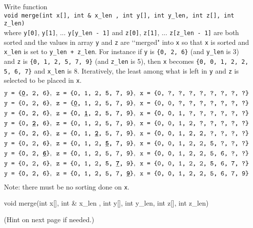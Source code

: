 

\nextq
Write function \\
\verb!void merge(int x[], int & x_len , int y[], int y_len, int z[], int z_len)!
\\
where
\verb!y[0]!,
\verb!y[1]!, ...
\verb!y[y_len - 1]!
and
\verb!z[0]!,
\verb!z[1]!, ...
\verb!z[z_len - 1]!
are both sorted
and
the values in array \verb!y! and \verb!z! are
\lq\lq merged" into \verb!x! so that
\verb!x! is sorted and \verb!x_len! is
set to \verb!y_len + z_len!.
For instance if \verb!y! is \verb!{0, 2, 6}!
(and \verb!y_len! is 3)
and \verb!z! is \verb!{0, 1, 2, 5, 7, 9}! (and \verb!z_len! is 5),
then \verb!x!
becomes \verb!{0, 0, 1, 2, 2, 5, 6, 7}!
and \verb!x_len! is 8.
Iteratively, the least among what is left in \verb!y! and \verb!z! is
selected to be placed in \verb!x!.
{\small
\begin{align*}
&\texttt{y = \{\textbf{\underline{0}}, 2, 6\}}, \,\,\,
  \texttt{z = \{0, 1, 2, 5, 7, 9\}}, \,\,\,
  \texttt{x = \{0, ?, ?, ?, ?, ?, ?, ?, ?\}}
\\
&\texttt{y = \{0, 2, 6\}}, \,\,\,
  \texttt{z = \{\textbf{\underline{0}}, 1, 2, 5, 7, 9\}}, \,\,\,
  \texttt{x = \{0, 0, ?, ?, ?, ?, ?, ?, ?\}}
\\
&\texttt{y = \{0, 2, 6\}}, \,\,\,
  \texttt{z = \{0, \textbf{\underline{1}}, 2, 5, 7, 9\}}, \,\,\,
  \texttt{x = \{0, 0, 1, ?, ?, ?, ?, ?, ?\}}
\\
&\texttt{y = \{0, \textbf{\underline{2}}, 6\}}, \,\,\,
  \texttt{z = \{0, 1, 2, 5, 7, 9\}}, \,\,\,
  \texttt{x = \{0, 0, 1, 2, ?, ?, ?, ?, ?\}}
\\
&\texttt{y = \{0, 2, 6\}}, \,\,\,
  \texttt{z = \{0, 1, \textbf{\underline{2}}, 5, 7, 9\}}, \,\,\,
  \texttt{x = \{0, 0, 1, 2, 2, ?, ?, ?, ?\}}
  \\
&\texttt{y = \{0, 2, 6\}}, \,\,\,
  \texttt{z = \{0, 1, 2, \textbf{\underline{5}}, 7, 9\}}, \,\,\,
  \texttt{x = \{0, 0, 1, 2, 2, 5, ?, ?, ?\}}
  \\
&\texttt{y = \{0, 2, \textbf{\underline{6}}\}}, \,\,\,
  \texttt{z = \{0, 1, 2, 5, 7, 9\}}, \,\,\,
  \texttt{x = \{0, 0, 1, 2, 2, 5, 6, ?, ?\}}
  \\
&\texttt{y = \{0, 2, 6\}}, \,\,\,
  \texttt{z = \{0, 1, 2, 5, \textbf{\underline{7}}, 9\}}, \,\,\,
  \texttt{x = \{0, 0, 1, 2, 2, 5, 6, 7, ?\}}
  \\
&\texttt{y = \{0, 2, 6\}}, \,\,\,
  \texttt{z = \{0, 1, 2, 5, 7, \textbf{\underline{9}}\}}, \,\,\,
  \texttt{x = \{0, 0, 1, 2, 2, 5, 6, 7, 9\}}
\end{align*}
}%
Note: there must be no sorting done on \verb!x!.
\\
\ANSWER
\begin{answercode}
void merge(int x[], int & x_len , int y[], int y_len, int z[], int z_len)
{
}
\end{answercode}
(Hint on next page if needed.)


